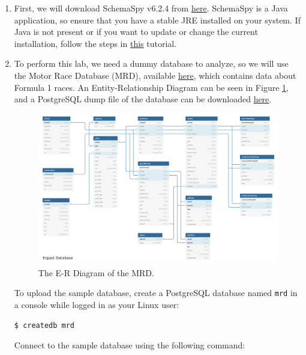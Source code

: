 \documentclass{article}
\begin{document}
\begin{enumerate}
    \item First, we will download SchemaSpy v6.2.4 from \href{https://github.com/schemaspy/schemaspy/releases/tag/v6.2.4}{here}. SchemaSpy is a Java application, so ensure that you have a stable JRE installed on your system. If Java is not present or if you want to update or change the current installation, follow the steps in \href{https://www.linuxcloudvps.com/blog/install-java-lts-on-ubuntu-24-04/}{this} tutorial.
 
    \item To perform this lab, we need a dummy database to analyze, so we will use the Motor Race Database (MRD), available \href{https://github.com/aocalderon/ergast-mrd}{here}, which contains data about Formula 1 races. An Entity-Relationship Diagram can be seen in Figure \ref{fig:erd}, and a PostgreSQL dump file of the database can be downloaded \href{https://drive.google.com/file/d/1ARHlgpcgQ0nddTUFsQqdevDfFYbGPd6d/view?usp=sharing}{here}.

    \begin{figure}[t]
        \includegraphics[width=\textwidth]{figures/mrd.png}
        \caption{The E-R Diagram of the MRD.}
        \label{fig:erd}
    \end{figure}

    To upload the sample database, create a PostgreSQL database named \texttt{mrd} in a console while logged in as your Linux user:
 
    \begin{lstlisting}[language=bash]
    $ createdb mrd
    \end{lstlisting}

    Connect to the sample database using the following command:


\end{enumerate}
\end{document}
